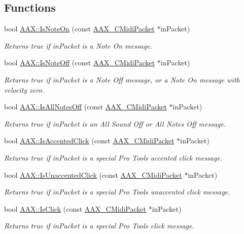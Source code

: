 \subsection*{Functions}
\begin{DoxyCompactItemize}
\item 
bool \mbox{\hyperlink{a00852_a1561efb3b1dbe3d13ef18f4b4d9dee40}{A\+A\+X\+::\+Is\+Note\+On}} (const \mbox{\hyperlink{a01429}{A\+A\+X\+\_\+\+C\+Midi\+Packet}} $\ast$in\+Packet)
\begin{DoxyCompactList}\small\item\em Returns true if {\ttfamily in\+Packet} is a Note On message. \end{DoxyCompactList}\item 
bool \mbox{\hyperlink{a00852_a91041690c271a718ef9451f66a7f6bb2}{A\+A\+X\+::\+Is\+Note\+Off}} (const \mbox{\hyperlink{a01429}{A\+A\+X\+\_\+\+C\+Midi\+Packet}} $\ast$in\+Packet)
\begin{DoxyCompactList}\small\item\em Returns true if {\ttfamily in\+Packet} is a Note Off message, or a Note On message with velocity zero. \end{DoxyCompactList}\item 
bool \mbox{\hyperlink{a00852_a509974acde19fde832cd5fdeb5eaabe2}{A\+A\+X\+::\+Is\+All\+Notes\+Off}} (const \mbox{\hyperlink{a01429}{A\+A\+X\+\_\+\+C\+Midi\+Packet}} $\ast$in\+Packet)
\begin{DoxyCompactList}\small\item\em Returns true if {\ttfamily in\+Packet} is an All Sound Off or All Notes Off message. \end{DoxyCompactList}\item 
bool \mbox{\hyperlink{a00852_afd05400c946e625772428cad4be7d552}{A\+A\+X\+::\+Is\+Accented\+Click}} (const \mbox{\hyperlink{a01429}{A\+A\+X\+\_\+\+C\+Midi\+Packet}} $\ast$in\+Packet)
\begin{DoxyCompactList}\small\item\em Returns true if {\ttfamily in\+Packet} is a special Pro Tools accented click message. \end{DoxyCompactList}\item 
bool \mbox{\hyperlink{a00852_a4f915a56cb150638f036cb7ed33facd8}{A\+A\+X\+::\+Is\+Unaccented\+Click}} (const \mbox{\hyperlink{a01429}{A\+A\+X\+\_\+\+C\+Midi\+Packet}} $\ast$in\+Packet)
\begin{DoxyCompactList}\small\item\em Returns true if {\ttfamily in\+Packet} is a special Pro Tools unaccented click message. \end{DoxyCompactList}\item 
bool \mbox{\hyperlink{a00852_a8f9544e49b4473862e0c1382f6963ce7}{A\+A\+X\+::\+Is\+Click}} (const \mbox{\hyperlink{a01429}{A\+A\+X\+\_\+\+C\+Midi\+Packet}} $\ast$in\+Packet)
\begin{DoxyCompactList}\small\item\em Returns true if {\ttfamily in\+Packet} is a special Pro Tools click message. \end{DoxyCompactList}\end{DoxyCompactItemize}
